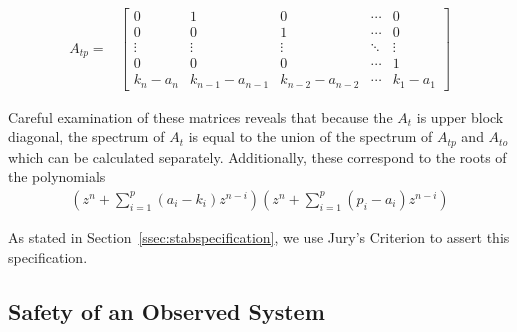 \documentclass[twocolumn]{autart}    %
\newcommand{\mat}[1]{{#1}}
\begin{document}
{\begin{align*}
\mat{A}_{tp}=&\left[
\begin{array}{ccccc}
0&1&0&\cdots&0\\
0&0&1&\cdots&0\\
\vdots&\vdots&\vdots&\ddots&\vdots\\
0&0&0&\cdots&1\\
k_n-a_n&k_{n-1}-a_{n-1}&k_{n-2}-a_{n-2}&\cdots&k_1-a_1
\end{array}\right]
\label{eq:cf_SISO_2}
\end{align*}

Careful examination of these matrices reveals that because the $\mat{A}_t$ is upper block diagonal, the spectrum of $\mat{A}_t$ is equal to the union of the spectrum of $\mat{A}_{tp}$ and $\mat{A}_{to}$ which can be calculated separately. Additionally, these correspond to the roots of the polynomials
\begin{align*}
\left(z^n+\sum_{i=1}^p{(a_i-k_i)z^{n-i}}\right) \left(z^n+\sum_{i=1}^p{(p_i-a_i)z^{n-i}}\right)
\end{align*}

As stated in Section~\ref{ssec:stabspecification}, we use Jury's Criterion
to assert this specification.

\subsection{Safety of an Observed System}\label{sec:cof_safety}

}
\end{document}
